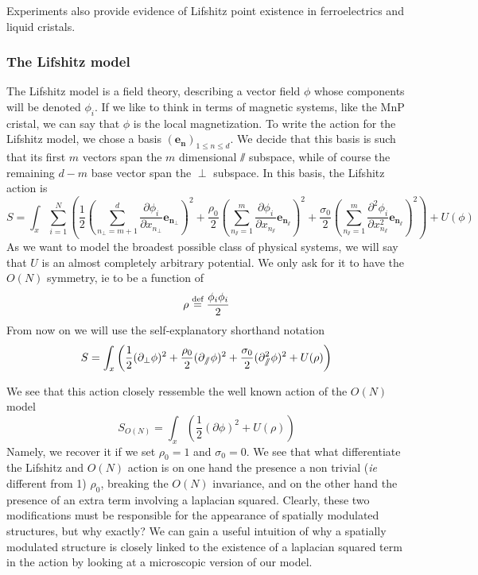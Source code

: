 Experiments also provide evidence of Lifshitz point existence in ferroelectrics and liquid cristals.

\subsubsection{The Lifshitz model}

The Lifshitz model is a field theory, describing a vector field $\phi$ whose components will be denoted $\phi_i$.
If we like to think in terms of magnetic systems, like the MnP cristal, we can say that $\phi$ is the local magnetization.
 To write the action for the Lifshitz model, we chose a basis $(\mathbf{e_n})_{1 \leq n \leq d}$. We decide that this basis is such that its first $m$ vectors span the $m$ dimensional $\sslash$ subspace, while of course the remaining $d-m$ base vector span the $\perp$ subspace. In this basis, the Lifshitz action is
\begin{equation}
S = \int_x \sum_{i=1}^N \left( \frac{1}{2} \left(\sum_{n_\perp=m+1}^{d}\frac{\partial \phi_i}{\partial x_{n_\perp}} \mathbf{e_{n_\perp}}\right)^2 + \frac{\rho_0}{2} \left(\sum_{n_\sslash=1}^{m}\frac{\partial \phi_i}{\partial x_{n_\sslash}} \mathbf{e_{n_\sslash}}\right)^2 + \frac{\sigma_0}{2} \left(\sum_{n_\sslash=1}^{m} \frac{\partial^2 \phi_i}{\partial x_{n_\sslash}^2} \mathbf{e_{n_\sslash}}\right)^2 \right) + U(\phi)
\end{equation}
As we want to model the broadest possible class of physical systems, we will say that $U$ is an almost completely arbitrary potential. We only ask for it to have the $O(N)$ symmetry, ie to be a function of
\begin{equation}
\rho  \overset{\text{def}}{=}  \frac{\phi_i \phi_i}{2}
\end{equation}
From now on we will use the self-explanatory shorthand notation
\begin{equation}
S = \int_x \left( \frac{1}{2}(\partial_{\perp} \phi)^2 + \frac{\rho_0}{2}(\partial_{\sslash} \phi)^2 + \frac{\sigma_0}{2} (\partial_{\sslash}^2 \phi)^2 + U(\rho) \right)
\end{equation}

We see that this action closely ressemble the well known action of the $O(N)$ model
\begin{equation}
S_{O(N)} = \int_x \left( \frac{1}{2}(\partial \phi)^2 + U(\rho) \right)
\end{equation}
Namely, we recover it if we set $\rho_0 = 1$ and $\sigma_0 = 0$. We see that what differentiate the Lifshitz and $O(N)$ action is on one hand the presence a non trivial (\textit{ie} different from 1) $\rho_0$, breaking the $O(N)$ invariance, and on the other hand the presence of an extra term involving a laplacian squared. Clearly, these two modifications must be responsible for the appearance of spatially modulated structures, but why exactly? 
We can gain a useful intuition of why a spatially modulated structure is closely linked to the existence of a laplacian squared term in the action by looking at a microscopic version of our model. 

